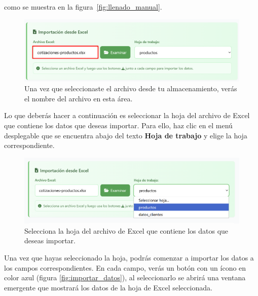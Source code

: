 \documentclass{Pretexto/bluereport}
\begin{document}
como se muestra en la figura~\ref{fig:llenado_manual}.
\begin{figure}[H] 
    \centering
        \includegraphics[width=0.7\linewidth]{img/archivos_cargados.png}
    \caption{Una vez que seleccionaste el archivo desde tu almacenamiento, verás el nombre del archivo en esta área.}
    \label{fig:archivos_cargados}
\end{figure}
Lo que deberás hacer a continuación es seleccionar la hoja del archivo de Excel que contiene los datos que deseas importar. 
Para ello, haz clic en el menú desplegable que se encuentra abajo del texto  \textbf{Hoja de trabajo} y elige la hoja correspondiente.
\begin{figure}[H] 
    \centering
        \includegraphics[width=0.7\linewidth]{img/seleccionar_hoja.png}
    \caption{Selecciona la hoja del archivo de Excel que contiene los datos que deseas importar.}
    \label{fig:seleccionar_hoja}
\end{figure}

Una vez que hayas seleccionado la hoja, podrás comenzar a importar los datos a los campos correspondientes.
En cada campo, verás un botón con un ícono en color azul (figura \ref{fig:importar_datos}), al seleccionarlo
 se abrirá una ventana emergente que mostrará los datos de la hoja de Excel seleccionada.
 
\end{document}

